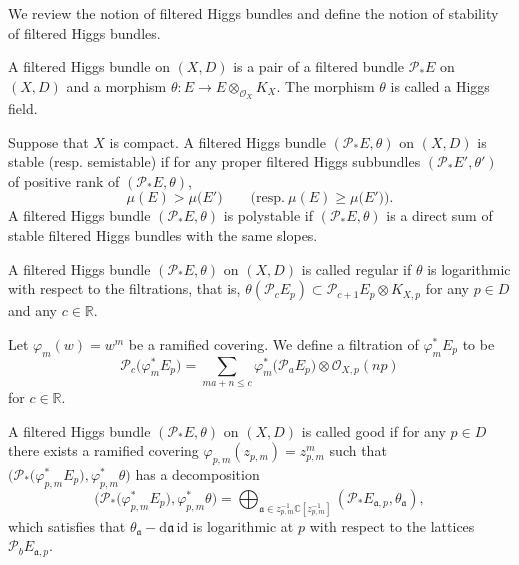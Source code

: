 \documentclass[pdftex]{sigma}
\numberwithin{equation}{section}
\newcommand{\R}{\mathbb{R}}
\newcommand{\id}{\mathrm{id}}
\newcommand{\strsheaf}{\mathcal{O}}
\begin{document}
We review the notion of filtered Higgs bundles and define the notion of stability of filtered Higgs bundles.
\begin{Definition}
 A filtered Higgs bundle on $(X,D)$ is a pair of a filtered bundle $\mathcal{P}_{*} E$ on $(X,D)$ and a morphism $\theta\colon E\to E\otimes_{\strsheaf_{X}} K_{X}$. The morphism $\theta$ is called a Higgs field.
\end{Definition}

\begin{Definition}
 Suppose that $X$ is compact.
 A filtered Higgs bundle $(\mathcal{P}_{*} E,\theta)$ on $(X,D)$ is stable (resp. semistable) if for any
 proper filtered Higgs subbundles $(\mathcal{P}_{*} E',\theta')$ of positive rank of $(\mathcal{P}_{*} E,\theta)$,
 \begin{equation*}
 \mu(E) > \mu\bigl(E'\bigr)\qquad \bigl(\text{resp.}\ \mu(E) \geq \mu\bigl(E'\bigr)\bigr).
 \end{equation*}
 A filtered Higgs bundle $(\mathcal{P}_{*} E,\theta)$ is polystable if $(\mathcal{P}_{*} E,\theta)$ is a direct sum of stable filtered Higgs bundles with the same slopes.
\end{Definition}
\begin{Definition}
 A filtered Higgs bundle $(\mathcal{P}_{*} E,\theta)$ on $(X,D)$ is called regular if $\theta$ is logarithmic with respect to the filtrations, that is, $\theta(\mathcal{P}_{c} E_p)\subset \mathcal{P}_{c+1} E_p\otimes K_{X,p}$ for any $p\in D$ and any $c\in \R$.
\end{Definition}
Let $\varphi_m(w)=w^m$ be a ramified covering. We define a filtration of $\varphi_m ^{*}E_p$ to be
\begin{equation*}
 \mathcal{P}_{c}\bigl(\varphi_m ^{*} E_p\bigr) = \sum_{ma+n\leq c} \varphi_m ^{*}\bigl(\mathcal{P}_{a} E_p\bigr)\otimes \strsheaf_{X,p}(np)
\end{equation*}
for $c\in\R$.
\begin{Definition}
 A filtered Higgs bundle $(\mathcal{P}_{*} E,\theta)$ on $(X,D)$ is called good if for any $p\in D$ there exists a ramified covering $\varphi_{p,m}(z_{p,m})=z_{p,m}^m$ such that $\bigl(\mathcal{P}_{*}\bigl(\varphi_{p,m}^{*}E_p\bigr),\varphi_{p,m}^{*}\theta\bigr)$ has a decomposition
 \begin{equation*}
 \bigl(\mathcal{P}_{*}\bigl(\varphi_{p,m}^{*}E_p\bigr),\varphi_{p,m}^{*}\theta\bigr) = \bigoplus_{\mathfrak{a} \in z_{p,m}^{-1}\mathbb{C}[z_{p,m}^{-1}]} (\mathcal{P}_{*} E_{\mathfrak{a},p},\theta_{\mathfrak{a}}),
 \end{equation*}
 which satisfies that $\theta_{\mathfrak{a}} - \mathrm{d}\mathfrak{a}\, \id$ is logarithmic at $p$ with respect to the lattices $\mathcal{P}_{b}E_{\mathfrak{a},p}$.
\end{Definition}
\end{document}
